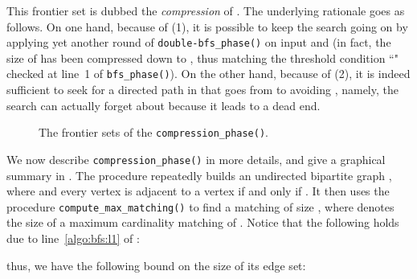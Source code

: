 This frontier set  is dubbed the \emph{compression} of . The underlying rationale goes as follows.
On one hand, because of (1), it is possible to keep the search going on by applying yet another round of \texttt{double-bfs\_phase()} on input  and 
(in fact, the size of  has been compressed down to ,
thus matching the threshold condition ``" checked at line~1 of \texttt{bfs\_phase()}).
On the other hand, because of (2), it is indeed sufficient to seek for a directed path in  that goes from  to  avoiding ,
namely, the search can actually forget about  because it leads to a dead end.
\begin{figure}[!htb]
    \centering
    \caption{The frontier sets of the \texttt{compression\_phase()}.}
\label{fig:compression_phase}
\end{figure}
We now describe \texttt{compression\_phase()} in more details,
and give a graphical summary in .
The procedure repeatedly builds an undirected bipartite graph
,
where  and
every vertex
 is adjacent to a vertex 
if and only if .
It then uses the procedure \texttt{compute\_max\_matching()} to find a matching
 of size ,
  where  denotes the size of a maximum cardinality matching of .
Notice that the following holds due to line~\ref{algo:bfs:l1} of :

thus, we have the following bound on the size of its edge set:


